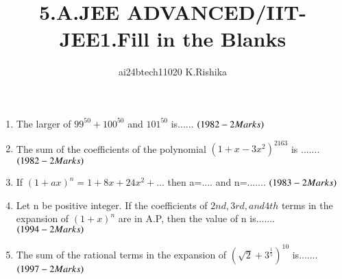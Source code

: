 \documentclass[journal,12pt,twocolumn]{IEEEtran}
\theoremstyle{remark}
\begin{document}

\vspace{3cm}

\title{5.A.JEE ADVANCED/IIT-JEE1.Fill in the Blanks}
\author{ai24btech11020 K.Rishika}

\maketitle
\bigskip   
\renewcommand{\thefigure}{\theenumi}
\renewcommand{\thetable}{\theenumi}     
\begin{enumerate}[start=1]
\item The larger of $99^{50}+100^{50}$ and $101^{50}$ is......
	\hfill$\left(1982- 2 Marks\right)$\\
\item The sum of the coefficients of the polynomial $(1+x-3x^2)^{2163}$ is .......
	\hfill$\left(1982- 2 Marks\right)$\\
\item If $(1+ax)^n=1+8x+24x^2+...$ then a=.... and n=.......
	\hfill$\left(1983- 2 Marks\right)$\\
\item Let n be positive integer. If the coefficients of $2nd, 3rd, and 4th$ terms in the expansion of $(1 + x)^n$ are in A.P, then the value of n is.......
	\hfill$\left(1994- 2 Marks\right)$\\
\item The sum of the rational terms in the expansion of $(\sqrt{2}+3^\frac{1}{5})^{10}$ is.......
	\hfill$\left(1997- 2 Marks\right)$
\end{enumerate}
\end{document}
